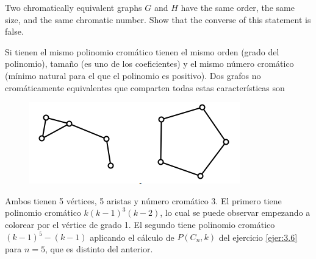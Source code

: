 \documentclass[twoside]{article}
\begin{document}
\begin{ejercicio}{3.12}
Two chromatically equivalent graphs $G$ and $H$ have the same order, the same size, and
the same chromatic number. Show that the converse of this statement is false.
\end{ejercicio}
\begin{solucion}
Si tienen el mismo polinomio cromático tienen el mismo orden (grado del polinomio), tamaño (es uno de los coeficientes) y el mismo número cromático (mínimo natural para el que el polinomio es positivo). Dos grafos no cromáticamente equivalentes que comparten todas estas características son 

\begin{figure}[h!]
\centering
\includegraphics[scale=0.6]{equivalent}
\end{figure}

Ambos tienen 5 vértices, 5 aristas y número cromático 3. El primero tiene polinomio cromático $k(k-1)^3(k-2)$, lo cual se puede observar empezando a colorear por el vértice de grado 1. El segundo tiene polinomio cromático $(k-1)^5-(k-1)$ aplicando el cálculo de $P(C_n,k)$ del ejercicio \ref{ejer:3.6} para $n=5$, que es distinto del anterior.

\end{solucion}
\end{document}
